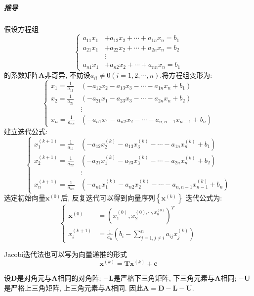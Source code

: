\subparagraph{推导}
假设方程组
$$\left\{
\begin{aligned}
a_{11}x_1 &+ a_{12}x_2 + \cdots + a_{1n}x_n = b_1 \\ 
a_{21}x_1 &+ a_{22}x_2 + \cdots + a_{2n}x_n = b_2 \\ 
&\vdots \\
a_{n1}x_1 &+ a_{n2}x_2 + \cdots + a_{nn}x_n = b_1 
\end{aligned}
\right.$$
的系数矩阵$\mathbf{A}$非奇异, 不妨设$a_{ii} \neq 0\left(i=1,2,\cdots,n\right)$.将方程组变形为:
$$\left\{
\begin{aligned}
x_1 = \frac{1}{a_{11}}&\left(-a_{12}x_2 -a_{13}x_3 -\cdots - a_{1n}x_n +b_1\right) \\
x_2 = \frac{1}{a_{22}}&\left(-a_{21}x_1 -a_{23}x_3 -\cdots - a_{2n}x_n +b_2\right) \\
&\vdots \\
x_n = \frac{1}{a_{nn}}&\left(-a_{n1}x_1 -a_{n2}x_2 -\cdots - a_{n,n-1}x_{n-1} +b_n\right) 
\end{aligned}
\right.$$
建立迭代公式:
$$\left\{
\begin{aligned}
x_1^{\left(k+1\right)} = \frac{1}{a_{11}}&\left(-a_{12}x_2^{\left(k\right)} -a_{13}x_3^{\left(k\right)} -\cdots - a_{1n}x_n^{\left(k\right)} +b_1\right) \\
x_2^{\left(k+1\right)} = \frac{1}{a_{22}}&\left(-a_{21}x_1^{\left(k\right)} -a_{23}x_3^{\left(k\right)} -\cdots - a_{2n}x_n^{\left(k\right)} +b_2\right) \\
&\vdots \\
x_n^{\left(k+1\right)} = \frac{1}{a_{nn}}&\left(-a_{n1}x_1^{\left(k\right)} -a_{n2}x_2^{\left(k\right)} -\cdots - a_{n,n-1}x_{n-1}^{\left(k\right)} +b_n\right) 
\end{aligned}
\right.$$
选定初始向量$\mathbf{x}^{\left(0\right)}$后, 反复迭代可以得到向量序列$\left\{\mathbf{x}^{\left(k\right)} \right\}$
迭代公式为:
$$\left\{
\begin{aligned}
\mathbf{x}^{\left(0\right)} &= \left(x_1^{\left(0\right)},x_2^{\left(0\right),\cdots,x_n^{\left(0\right)}}\right)^T \\
x_i^{\left(k+1\right)} &= \frac{1}{a_{ii}}\left(b_i - \sum_{j=1,j\neq i}^{n}a_{ij}x_j^{\left(k\right)} \right)
\end{aligned}
\right.$$

Jacobi迭代法也可以写为向量递推的形式
$$\mathbf{x}^{\left(k\right)} = \mathbf{T}\mathbf{x}^{\left(k\right)} + \mathbf{c}$$

设$\mathbf{D}$是对角元与$\mathbf{A}$相同的对角阵; $-\mathbf{L}$是严格下三角矩阵, 下三角元素与$\mathbf{A}$相同; $-\mathbf{U}$是严格上三角矩阵, 上三角元素与$\mathbf{A}$相同. 因此$\mathbf{A} = \mathbf{D} - \mathbf{L} - \mathbf{U}$.

